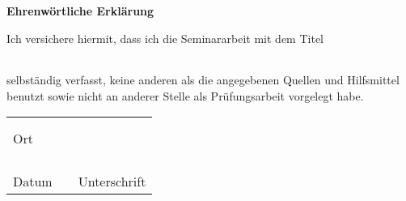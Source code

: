 \pagestyle{plain}


\textbf{{\Large Ehrenwörtliche Erklärung}}
\vspace{2cm}

  {\newcommand{\DocumentArticle}{meinen}}
  {
      {\newcommand{\DocumentWord}{meine}}
      {
          {\newcommand{\DocumentArticle}{meine}}
          {\newcommand{\DocumentArticle}{meine/n}}
      }
  }

Ich versichere hiermit, dass ich die Seminararbeit mit dem Titel
\vspace{1cm}

\begin{tabular*}{\linewidth}{@{\extracolsep{\fill}}ccc}
 \\ \hline
 \vspace{2cm}
 \\ \hline
\end{tabular*}
\vspace{2cm}

selbständig verfasst, keine anderen als die angegebenen Quellen und Hilfsmittel benutzt
sowie nicht an anderer Stelle als Prüfungsarbeit vorgelegt habe.
\vfill

\begin{table*}[hp]
  \centering
  \begin{tabular}{L{6cm}L{2cm}L{6cm}}
    & & \\
    & & \\ 
    Ort &  \\
    & & \\
    & & \\
    & & \\
    & &  \\  
    Datum & & Unterschrift \\
  \end{tabular}
\end{table*}